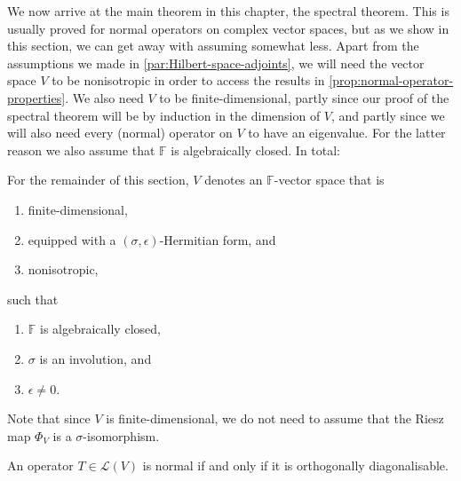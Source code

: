 \documentclass[a4paper, 11pt]{memoir}
\theoremstyle{plaincustomnumber}
\theoremstyle{changedotbreakcustomnumber}
\newcommand{\calL}{\mathcal{L}}
\newcommand{\field}{\mathbb{F}}
\begin{document}
\newpar\label{par:spectral-theorem}

We now arrive at the main theorem in this chapter, the spectral theorem. This is usually proved for normal operators on complex vector spaces, but as we show in this section, we can get away with assuming somewhat less. Apart from the assumptions we made in \cref{par:Hilbert-space-adjoints}, we will need the vector space $V$ to be nonisotropic in order to access the results in \cref{prop:normal-operator-properties}. We also need $V$ to be finite-dimensional, partly since our proof of the spectral theorem will be by induction in the dimension of $V$, and partly since we will also need every (normal) operator on $V$ to have an eigenvalue. For the latter reason we also assume that $\field$ is algebraically closed. In total:

\begin{assumption}
    For the remainder of this section, $V$ denotes an $\field$-vector space that is
    \begin{enumerate}
        \item finite-dimensional,
        \item equipped with a $(\sigma,\epsilon)$-Hermitian form, and
        \item nonisotropic,
    \end{enumerate}
    such that
    \begin{enumerate}[resume]
        \item $\field$ is algebraically closed,
        \item $\sigma$ is an involution, and
        \item $\epsilon \neq 0$.
    \end{enumerate}
\end{assumption}
%
Note that since $V$ is finite-dimensional, we do not need to assume that the Riesz map $\Phi_V$ is a $\sigma$-isomorphism.


\begin{theorem}
    \label{thm:spectral-theorem}
    An operator $T \in \calL(V)$ is normal if and only if it is orthogonally diagonalisable.
\end{theorem}
\end{document}
